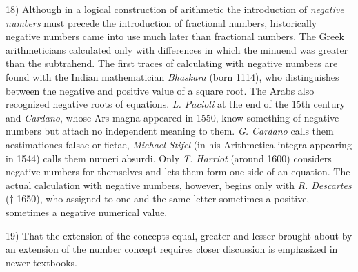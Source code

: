 \vfill
\leftline{\rule{2in}{0.4pt}}
\vspace{0.05cm}
{
\footnotesize
18) Although in a logical construction of arithmetic the introduction of \textit{negative numbers} must precede the introduction of fractional numbers, historically negative numbers came into use much later than fractional numbers. The Greek arithmeticians calculated only with differences in which the minuend was greater than the subtrahend. The first traces of calculating with negative numbers are found with the Indian mathematician \textit{Bhāskara} (born 1114), who distinguishes between the negative and positive value of a square root. The Arabs also recognized negative roots of equations. \textit{L. Pacioli} at the end of the 15th century and \textit{Cardano}, whose Ars magna appeared in 1550, know something of negative numbers but attach no independent meaning to them. \textit{G. Cardano} calls them aestimationes falsae or fictae, \textit{Michael Stifel} (in his Arithmetica integra appearing in 1544) calls them numeri absurdi. Only \textit{T. Harriot} (around 1600) considers negative numbers for themselves and lets them form one side of an equation. The actual calculation with negative numbers, however, begins only with \textit{R. Descartes} († 1650), who assigned to one and the same letter sometimes a positive, sometimes a negative numerical value.

19) That the extension of the concepts equal, greater and lesser brought about by an extension of the number concept requires closer discussion is emphasized in newer textbooks.

}

